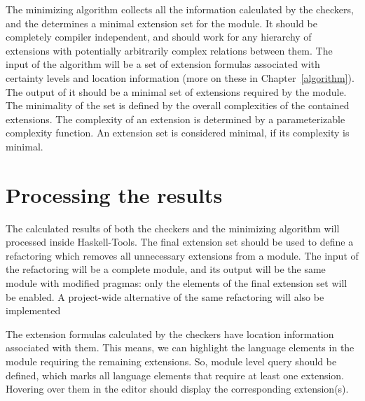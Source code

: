 \documentclass[main.tex]{subfiles}
\begin{document}
	The minimizing algorithm collects all the information calculated by the checkers, and the determines a minimal extension set for the module. It should be completely compiler independent, and should work for any hierarchy of extensions with potentially arbitrarily complex relations between them. The input of the algorithm will be a set of extension formulas associated with certainty levels and location information (more on these in Chapter~\ref{algorithm}). The output of it should be a minimal set of extensions required by the module. The minimality of the set is defined by the overall complexities of the contained extensions. The complexity of an extension is determined by a parameterizable complexity function. An extension set is considered minimal, if its complexity is minimal.
	
	\section{Processing the results}
	
	The calculated results of both the checkers and the minimizing algorithm will processed inside Haskell-Tools. The final extension set should be used to define a refactoring which removes all unnecessary extensions from a module. The input of the refactoring will be a complete module, and its output will be the same module with modified  pragmas: only the elements of the final extension set will be enabled. A project-wide alternative of the same refactoring will also be implemented 
	
	The extension formulas calculated by the checkers have location information associated with them. This means, we can highlight the language elements in the module requiring the remaining extensions. So, module level query should be defined, which marks all language elements that require at least one extension. Hovering over them in the editor should display the corresponding extension(s).
	
\end{document}

